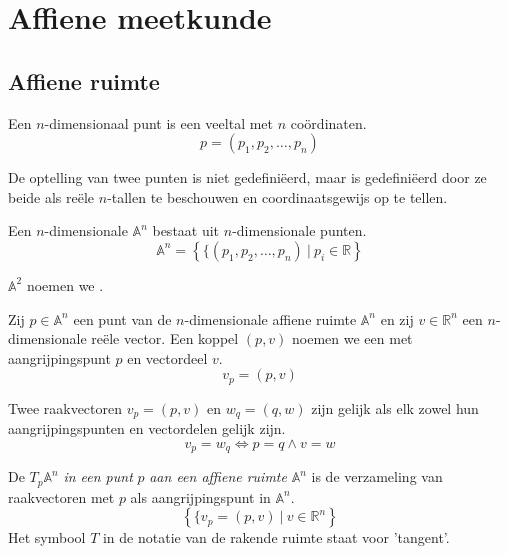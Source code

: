 \documentclass[main.tex]{subfiles}
\begin{document}
\chapter{Affiene meetkunde}
\label{cha:affiene-meetkunde}

\section{Affiene ruimte}
\label{sec:affiene-ruimte}

\begin{de}
  Een $n$-dimensionaal punt is een veeltal met $n$ co\"ordinaten.
  \[ p = (p_{1}, p_{2}, \ldots, p_{n}) \]
\end{de}

\begin{de}
  De optelling van twee punten is niet gedefini\"eerd, maar  is gedefini\"eerd door ze beide als re\"ele $n$-tallen te beschouwen en coordinaatsgewijs op te tellen.
\end{de}

\begin{de}
  Een $n$-dimensionale  $\mathbb{A}^{n}$ bestaat uit $n$-dimensionale punten.
  \[ \mathbb{A}^{n} = \left\{\{ (p_{1}, p_{2}, \ldots, p_{n}) \ |\ p_{i} \in \mathbb{R} \right\} \]
\end{de}

\begin{de}
  $\mathbb{A}^{2}$ noemen we .
\end{de}

\begin{de}
  Zij $p \in \mathbb{A}^{n}$ een punt van de $n$-dimensionale affiene ruimte $\mathbb{A}^{n}$ en zij $v \in \mathbb{R}^{n}$ een $n$-dimensionale re\"ele vector.
  Een koppel $(p,v)$ noemen we een  met aangrijpingspunt $p$ en vectordeel $v$.
  \[ v_{p} = (p,v) \]
\end{de}

\begin{de}
  Twee raakvectoren $v_{p} = (p,v)$ en $w_{q} = (q,w)$ zijn gelijk als elk zowel hun aangrijpingspunten en vectordelen gelijk zijn.
  \[ v_{p} = w_{q} \Leftrightarrow p = q \wedge v = w \]
\end{de}

\begin{de}
  De  $T_{p}\mathbb{A}^{n}$ \emph{in een punt} $p$ \emph{aan een affiene ruimte} $\mathbb{A}^{n}$ is de verzameling van raakvectoren met $p$ als aangrijpingspunt in $\mathbb{A}^{n}$.
  \[ \left\{\{v_{p} = (p,v)\ |\ v \in \mathbb{R}^{n} \right\} \]
  Het symbool $T$ in de notatie van de rakende ruimte staat voor 'tangent'.
\end{de}
\end{document}
